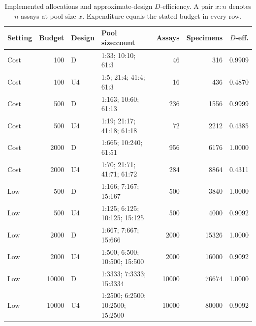\documentclass[11pt]{article}
\begin{document}
\begin{table}[!htbp]\centering\scriptsize
\caption{Implemented allocations and approximate-design $D$-efficiency. A pair $x:n$ denotes $n$ assays at pool size $x$. Expenditure equals the stated budget in every row.}\label{tab:bias-allocations}
\begin{tabular}{lrl lrrr}\toprule
Setting & Budget & Design & Pool size:count & Assays & Specimens & $D$-eff.\\\midrule
Cost &   100 & D & 1:33; 10:10; 61:3 &    46 &   316 & 0.9909 \\
Cost &   100 & U4 & 1:5; 21:4; 41:4; 61:3 &    16 &   436 & 0.4870 \\
Cost &   500 & D & 1:163; 10:60; 61:13 &   236 &  1556 & 0.9999 \\
Cost &   500 & U4 & 1:19; 21:17; 41:18; 61:18 &    72 &  2212 & 0.4385 \\
Cost &  2000 & D & 1:665; 10:240; 61:51 &   956 &  6176 & 1.0000 \\
Cost &  2000 & U4 & 1:70; 21:71; 41:71; 61:72 &   284 &  8864 & 0.4311 \\
Low &   500 & D & 1:166; 7:167; 15:167 &   500 &  3840 & 1.0000 \\
Low &   500 & U4 & 1:125; 6:125; 10:125; 15:125 &   500 &  4000 & 0.9092 \\
Low &  2000 & D & 1:667; 7:667; 15:666 &  2000 & 15326 & 1.0000 \\
Low &  2000 & U4 & 1:500; 6:500; 10:500; 15:500 &  2000 & 16000 & 0.9092 \\
Low & 10000 & D & 1:3333; 7:3333; 15:3334 & 10000 & 76674 & 1.0000 \\
Low & 10000 & U4 & 1:2500; 6:2500; 10:2500; 15:2500 & 10000 & 80000 & 0.9092 \\

\bottomrule\end{tabular}\end{table}
\end{document}
